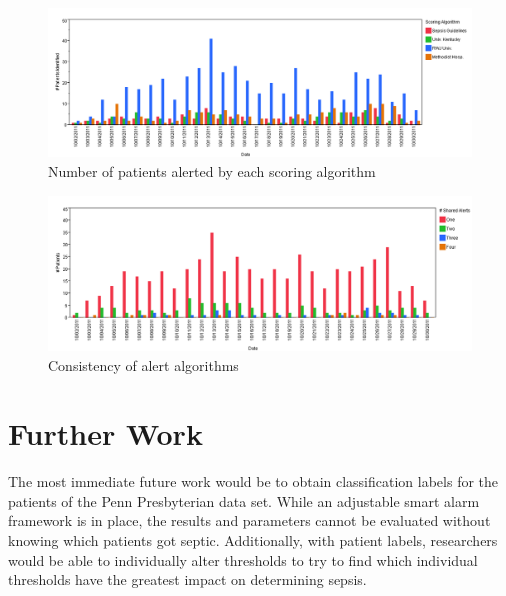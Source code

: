 \documentclass{sig-alternate}
\begin{document}
\begin{figure}
	\begin{center}
		\includegraphics[width=1.0\linewidth]{NumPatientsComp.png}
	\end{center}
	\caption{Number of patients alerted by each scoring algorithm}
	\label{fig:num_patients}
\end{figure}

\begin{figure}
	\begin{center}
		\includegraphics[width=1.0\linewidth]{ScoringComparision_Similarities.png}
	\end{center}
	\caption{Consistency of alert algorithms}
	\label{fig:num_alerts}
\end{figure}

\vspace{10pt}
\section{Further Work}
\vspace{10pt}
\label{sec:furtherwork}

The most immediate future work would be to obtain classification labels for the patients of the Penn Presbyterian data set.  While an adjustable smart alarm framework is in place, the results and parameters cannot be evaluated without knowing which patients got septic.  Additionally, with patient labels, researchers would be able to individually alter thresholds to try to find which individual thresholds have the greatest impact on determining sepsis.  
\end{document}
